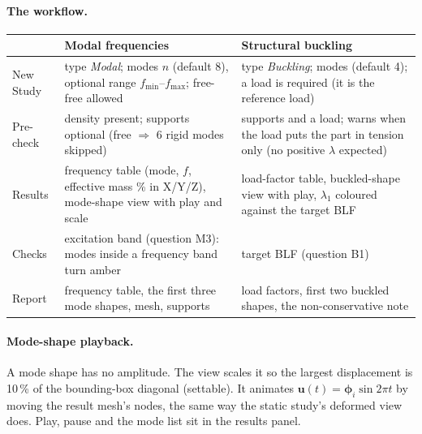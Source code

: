 \paragraph{The workflow.}
\begin{center}
\small
\begin{tabularx}{\linewidth}{@{}lXX@{}}
\toprule
 & Modal frequencies & Structural buckling\\
\midrule
New Study & type \emph{Modal}; modes $n$ (default 8), optional range $f_{\min}$--$f_{\max}$; free-free allowed
  & type \emph{Buckling}; modes (default 4); a load is required (it is the reference load)\\
Pre-check & density present; supports optional (free $\Rightarrow$ 6 rigid modes skipped)
  & supports and a load; warns when the load puts the part in tension only (no positive $\lambda$ expected)\\
Results & frequency table (mode, $f$, effective mass \% in X/Y/Z), mode-shape view with play and scale
  & load-factor table, buckled-shape view with play, $\lambda_1$ coloured against the target BLF\\
Checks & excitation band (question M3): modes inside a frequency band turn amber
  & target BLF (question B1)\\
Report & frequency table, the first three mode shapes, mesh, supports
  & load factors, first two buckled shapes, the non-conservative note\\
\bottomrule
\end{tabularx}
\end{center}

\paragraph{Mode-shape playback.} A mode shape has no amplitude. The view scales it so the largest
displacement is 10\,\% of the bounding-box diagonal (settable). It animates
$\mathbf u(t)=\boldsymbol\phi_i\sin2\pi t$ by moving the result mesh's nodes, the same way the static
study's deformed view does. Play, pause and the mode list sit in the results panel.

